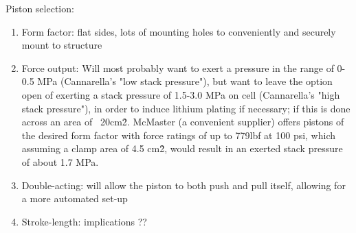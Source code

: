 Piston selection:
\begin{enumerate}
    \item Form factor: flat sides, lots of mounting holes to conveniently and securely mount to structure
    \item Force output: Will most probably want to exert a pressure in the range of 0-0.5 MPa (Cannarella's "low stack pressure"), but want to leave the option open of exerting a stack pressure of 1.5-3.0 MPa on cell (Cannarella's "high stack pressure"), in order to induce lithium plating if necessary; if this is done across an area of ~20cm\^2. McMaster (a convenient supplier) offers pistons of the desired form factor with force ratings of up to 779lbf at 100 psi, which assuming a clamp area of 4.5 cm\^2, would result in an exerted stack pressure of about 1.7 MPa.
    \item Double-acting: will allow the piston to both push and pull itself, allowing for a more automated set-up
    \item Stroke-length: implications ??
\end{enumerate}
    